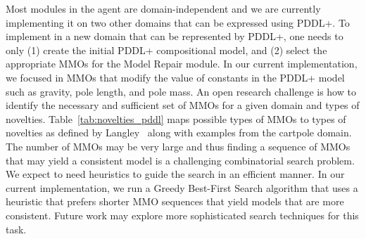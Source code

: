 \documentclass{article}
\begin{document}
Most modules in the \hydra agent are domain-independent and we are currently implementing it on two other domains that can be expressed using PDDL+. 
To implement \hydra in a new domain that can be represented by PDDL+, one needs to only (1) create the initial PDDL+ compositional model, and (2) select the appropriate MMOs for the Model Repair module.
In our current implementation, we focused in MMOs that modify the value of constants in the PDDL+ model such as gravity, pole length, and pole mass. 
An open research challenge is how to identify the necessary and sufficient set of MMOs for a given domain and types of novelties. 
Table~\ref{tab:novelties_pddl} maps possible types of MMOs to types of novelties as defined by Langley~\cite{langley2020open} along with examples from the cartpole domain. 
The number of MMOs may be very large and thus finding a sequence of MMOs that may yield a consistent model is a challenging combinatorial search problem.  We expect to need heuristics to guide the search in an efficient manner. 
In our current implementation, we run a Greedy Best-First Search algorithm that uses a heuristic that prefers shorter MMO sequences that yield models that are more consistent. Future work may explore more sophisticated search techniques for this task. %
\end{document}
